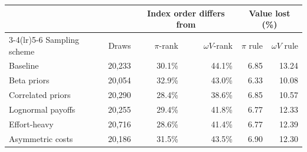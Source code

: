 \begin{tabular}{lrrrrr}
\toprule
 & & \multicolumn{2}{c}{Index order differs from} & \multicolumn{2}{c}{Value lost (\%)} \\
\cmidrule(lr){3-4}\cmidrule(lr){5-6}
Sampling scheme & Draws & $\pi$-rank & $\omega V$-rank & $\pi$ rule & $\omega V$ rule \\
\midrule
Baseline & 20,233 & 30.1\% & 44.1\% & 6.85 & 13.24 \\
Beta priors & 20,054 & 32.9\% & 43.0\% & 6.33 & 10.08 \\
Correlated priors & 20,290 & 28.4\% & 38.6\% & 6.85 & 10.57 \\
Lognormal payoffs & 20,255 & 29.4\% & 41.8\% & 6.77 & 12.33 \\
Effort-heavy & 20,716 & 28.6\% & 41.4\% & 6.77 & 12.39 \\
Asymmetric costs & 20,186 & 31.5\% & 43.5\% & 6.90 & 12.30 \\
\bottomrule
\end{tabular}
